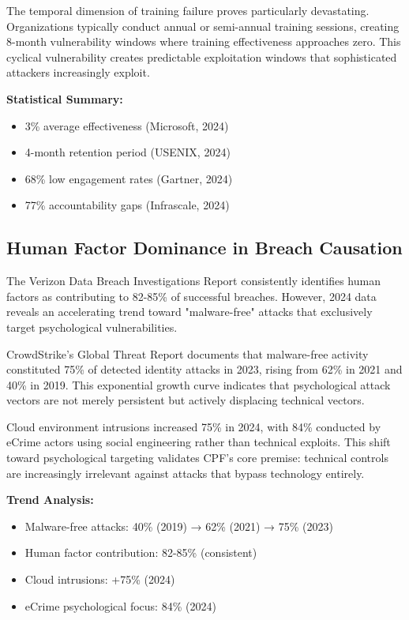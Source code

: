 \documentclass[11pt,a4paper]{article}
\begin{document}
The temporal dimension of training failure proves particularly devastating. Organizations typically conduct annual or semi-annual training sessions, creating 8-month vulnerability windows where training effectiveness approaches zero. This cyclical vulnerability creates predictable exploitation windows that sophisticated attackers increasingly exploit.

\textbf{Statistical Summary:}
\begin{itemize}
\item 3\% average effectiveness (Microsoft, 2024)
\item 4-month retention period (USENIX, 2024)
\item 68\% low engagement rates (Gartner, 2024)
\item 77\% accountability gaps (Infrascale, 2024)
\end{itemize}

\subsection{Human Factor Dominance in Breach Causation}

The Verizon Data Breach Investigations Report consistently identifies human factors as contributing to 82-85\% of successful breaches\cite{verizon2024}. However, 2024 data reveals an accelerating trend toward "malware-free" attacks that exclusively target psychological vulnerabilities.

CrowdStrike's Global Threat Report documents that malware-free activity constituted 75\% of detected identity attacks in 2023, rising from 62\% in 2021 and 40\% in 2019\cite{crowdstrike2024}. This exponential growth curve indicates that psychological attack vectors are not merely persistent but actively displacing technical vectors.

Cloud environment intrusions increased 75\% in 2024, with 84\% conducted by eCrime actors using social engineering rather than technical exploits\cite{crowdstrike2024}. This shift toward psychological targeting validates CPF's core premise: technical controls are increasingly irrelevant against attacks that bypass technology entirely.

\textbf{Trend Analysis:}
\begin{itemize}
\item Malware-free attacks: 40\% (2019) → 62\% (2021) → 75\% (2023)
\item Human factor contribution: 82-85\% (consistent)
\item Cloud intrusions: +75\% (2024)
\item eCrime psychological focus: 84\% (2024)
\end{itemize}
\end{document}
